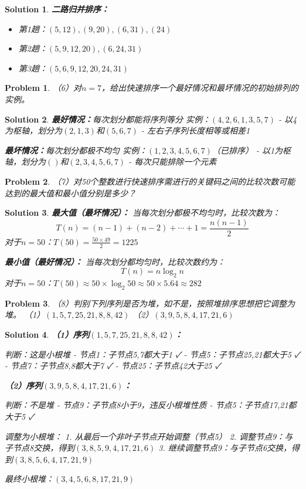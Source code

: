 \documentclass[12pt,a4paper]{amsart}
\newtheorem{problem}{Problem}[section]
\newtheorem{solution}{Solution}[section]
\begin{document}
\begin{solution}
\textbf{二路归并排序：}
\begin{itemize}
\item 第1趟：$(5,12),(9,20),(6,31),(24)$
\item 第2趟：$(5,9,12,20),(6,24,31)$
\item 第3趟：$(5,6,9,12,20,24,31)$
\end{itemize}
\end{solution}

\begin{problem}
（6）对$n=7$，给出快速排序一个最好情况和最坏情况的初始排列的实例。
\end{problem}

\begin{solution}
\textbf{最好情况：}每次划分都能将序列等分
实例：$(4,2,6,1,3,5,7)$
- 以4为枢轴，划分为$(2,1,3)$和$(5,6,7)$
- 左右子序列长度相等或相差1

\textbf{最坏情况：}每次划分都极不均匀
实例：$(1,2,3,4,5,6,7)$（已排序）
- 以1为枢轴，划分为$()$和$(2,3,4,5,6,7)$
- 每次只能排除一个元素
\end{solution}

\begin{problem}
（7）对50个整数进行快速排序需进行的关键码之间的比较次数可能达到的最大值和最小值分别是多少？
\end{problem}

\begin{solution}
\textbf{最大值（最坏情况）：}
当每次划分都极不均匀时，比较次数为：
$$T(n) = (n-1) + (n-2) + \cdots + 1 = \frac{n(n-1)}{2}$$
对于$n=50$：$T(50) = \frac{50 \times 49}{2} = 1225$

\textbf{最小值（最好情况）：}
当每次划分都均匀时，比较次数约为：
$$T(n) = n \log_2 n$$
对于$n=50$：$T(50) \approx 50 \times \log_2 50 \approx 50 \times 5.64 \approx 282$
\end{solution}

\begin{problem}
（8）判别下列序列是否为堆，如不是，按照堆排序思想把它调整为堆。
（1）$(1,5,7,25,21,8,8,42)$
（2）$(3,9,5,8,4,17,21,6)$
\end{problem}

\begin{solution}
\textbf{（1）序列$(1,5,7,25,21,8,8,42)$：}

判断：这是小根堆
- 节点1：子节点5,7都大于1 ✓
- 节点5：子节点25,21都大于5 ✓  
- 节点7：子节点8,8都大于7 ✓
- 节点25：子节点42大于25 ✓

\textbf{（2）序列$(3,9,5,8,4,17,21,6)$：}

判断：不是堆
- 节点9：子节点8小于9，违反小根堆性质
- 节点5：子节点17,21都大于5 ✓

调整为小根堆：
1. 从最后一个非叶子节点开始调整（节点5）
2. 调整节点9：与子节点8交换，得到$(3,8,5,9,4,17,21,6)$
3. 继续调整节点9：与子节点6交换，得到$(3,8,5,6,4,17,21,9)$

最终小根堆：$(3,4,5,6,8,17,21,9)$
\end{solution}
\end{document}
